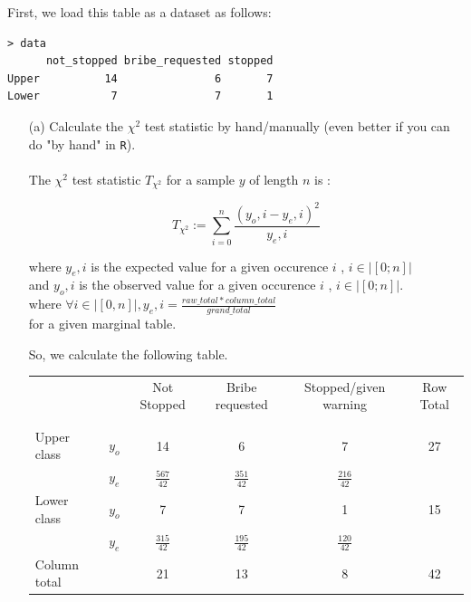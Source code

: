 \documentclass[12pt,letterpaper]{article}
\begin{document}
First, we load this table as a dataset as follows:

\vspace{.5cm}

  
\begin{verbatim}
> data
      not_stopped bribe_requested stopped
Upper          14               6       7
Lower           7               7       1
\end{verbatim}


\vspace{1cm}

\begin{enumerate}
	
	\item [(a)]
	Calculate the $\chi^2$ test statistic by hand/manually (even better if you can do "by hand" in \texttt{R}).\\
	\\
	The $\chi^2$ test statistic $T_{\chi^2}$ for a sample $y$ of length $n$ is :

	\begin{equation}
		T_{\chi^2}:= \sum_{i=0}^{n}\frac{(y_o,i - y_e,i)^2}{y_e,i}
	\end{equation}

	where $y_e,i$ is the expected value for a given occurence $i$ , $i \in  |[0;n]|$ \\
	and $y_o,i$ is the observed value for a given occurence $i$ , $i \in  |[0;n]|$.\\

	where $\forall i \in |[0,n]|,  y_e,i = \frac{raw\_total*column\_total}{grand\_total}$\\ for a given marginal table.
	
	So, we calculate the following table.
	\newpage
	\begin{table}[h!]
		\centering
		\begin{tabular}{ll | c c c c }
			& & Not Stopped & Bribe requested & Stopped/given warning & Row Total\\
			\\[-1.8ex] 
			\hline \\[-1.8ex]
			Upper class & $y_o$  & 14 & 6 & 7 & 27\\
					& $y_e$  & $\frac{567}{42}$ & $\frac{351}{42}$ & $\frac{216}{42}$  & \\
			Lower class &  $y_o$ & 7 & 7 & 1 &15\\
					& $y_e$  & $\frac{315}{42}$ & $\frac{195}{42}$ & $\frac{120}{42} $ & \\
			Column total &         &21&13&8&42\\
			\hline
		\end{tabular}
	\end{table}		


\end{enumerate}
\end{document}
